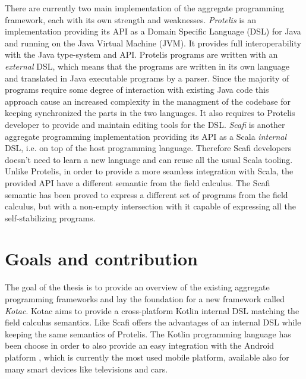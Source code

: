 There are currently two main implementation of the aggregate programming framework, each with its own strength and weaknesses. \textit{Protelis} \cite{Protelis} is an implementation providing its API as a Domain Specific Language (DSL) for Java and running on the Java Virtual Machine (JVM). It provides full interoperability with the Java type-system and API. Protelis programs are written with an \textit{external} DSL, which means that the programs are written in its own language and translated in Java executable programs by a parser. Since the majority of programs require some degree of interaction with existing Java code this approach cause an increased complexity in the managment of the codebase for keeping synchronized the parts in the two languages. It also requires to Protelis developer to provide and maintain editing tools for the DSL. \textit{Scafi} \cite{Scafi} is another aggregate programming implementation providing its API as a Scala \cite{Scala} \textit{internal} DSL, i.e. on top of the host programming language. Therefore Scafi developers doesn't need to learn a new language and can reuse all the usual Scala tooling. Unlike Protelis, in order to provide a more seamless integration with Scala, the provided API have a different semantic from the field calculus. The Scafi semantic has been proved to express a different set of programs from the field calculus, but with a non-empty intersection with it capable of expressing all the self-stabilizing programs.

\section{Goals and contribution}
The goal of the thesis is to provide an overview of the  existing aggregate programming frameworks and lay the foundation for a new framework called \textit{Kotac}. Kotac aims to provide a cross-platform Kotlin \cite{Kotlin} internal DSL matching the field calculus semantics. Like Scafi offers the advantages of an internal DSL while keeping the same semantics of Protelis. The Kotlin programming language has been choose in order to also provide an easy integration with the Android platform \cite{Android}, which is currently the most used mobile platform, available also for many smart devices like televisions and cars.

